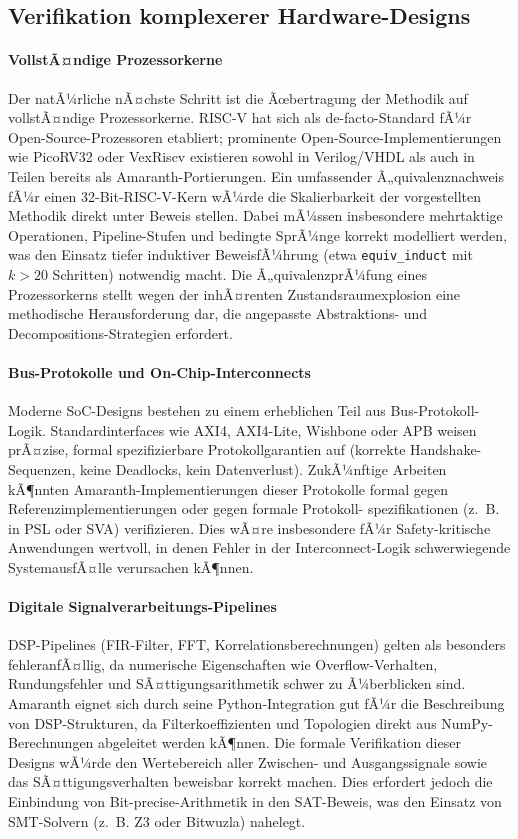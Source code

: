 ﻿\documentclass[12pt,a4paper]{report}
\begin{document}
\subsection{Verifikation komplexerer Hardware-Designs}

\paragraph{VollstÃ¤ndige Prozessorkerne}
Der natÃ¼rliche nÃ¤chste Schritt ist die Ãœbertragung der Methodik auf vollstÃ¤ndige
Prozessorkerne. RISC-V hat sich als de-facto-Standard fÃ¼r Open-Source-Prozessoren
etabliert; prominente Open-Source-Implementierungen wie PicoRV32 oder VexRiscv
existieren sowohl in Verilog/VHDL als auch in Teilen bereits als Amaranth-Portierungen.
Ein umfassender Ã„quivalenznachweis fÃ¼r einen 32-Bit-RISC-V-Kern wÃ¼rde die Skalierbarkeit
der vorgestellten Methodik direkt unter Beweis stellen. Dabei mÃ¼ssen insbesondere
mehrtaktige Operationen, Pipeline-Stufen und bedingte SprÃ¼nge korrekt modelliert werden,
was den Einsatz tiefer induktiver BeweisfÃ¼hrung (etwa \texttt{equiv\_induct} mit
$k > 20$ Schritten) notwendig macht. Die Ã„quivalenzprÃ¼fung eines Prozessorkerns
stellt wegen der inhÃ¤renten Zustandsraumexplosion eine methodische Herausforderung dar,
die angepasste Abstraktions- und Decompositions-Strategien erfordert.

\paragraph{Bus-Protokolle und On-Chip-Interconnects}
Moderne SoC-Designs bestehen zu einem erheblichen Teil aus Bus-Protokoll-Logik.
Standardinterfaces wie AXI4, AXI4-Lite, Wishbone oder APB weisen prÃ¤zise,
formal spezifizierbare Protokollgarantien auf (korrekte Handshake-Sequenzen,
keine Deadlocks, kein Datenverlust). ZukÃ¼nftige Arbeiten kÃ¶nnten Amaranth-Implementierungen
dieser Protokolle formal gegen Referenzimplementierungen oder gegen formale Protokoll-
spezifikationen (z.~B. in PSL oder SVA) verifizieren. Dies wÃ¤re insbesondere fÃ¼r
Safety-kritische Anwendungen wertvoll, in denen Fehler in der Interconnect-Logik
schwerwiegende SystemausfÃ¤lle verursachen kÃ¶nnen.

\paragraph{Digitale Signalverarbeitungs-Pipelines}
DSP-Pipelines (FIR-Filter, FFT, Korrelationsberechnungen) gelten als besonders
fehleranfÃ¤llig, da numerische Eigenschaften wie Overflow-Verhalten, Rundungsfehler und
SÃ¤ttigungsarithmetik schwer zu Ã¼berblicken sind. Amaranth eignet sich durch seine
Python-Integration gut fÃ¼r die Beschreibung von DSP-Strukturen, da Filterkoeffizienten
und Topologien direkt aus NumPy-Berechnungen abgeleitet werden kÃ¶nnen. Die formale
Verifikation dieser Designs wÃ¼rde den Wertebereich aller Zwischen- und Ausgangssignale
sowie das SÃ¤ttigungsverhalten beweisbar korrekt machen. Dies erfordert jedoch die
Einbindung von Bit-precise-Arithmetik in den SAT-Beweis, was den Einsatz von
SMT-Solvern (z.~B. Z3 oder Bitwuzla) nahelegt.
\end{document}
